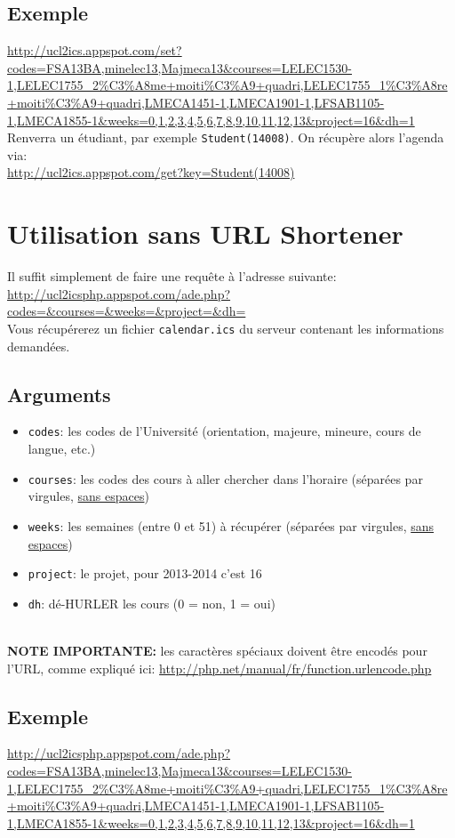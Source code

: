 \documentclass[12pt,a4paper]{article}
\begin{document}
\subsection{Exemple}
\noindent\url{http://ucl2ics.appspot.com/set?codes=FSA13BA,minelec13,Majmeca13&courses=LELEC1530-1,LELEC1755_2%C3%A8me+moiti%C3%A9+quadri,LELEC1755_1%C3%A8re+moiti%C3%A9+quadri,LMECA1451-1,LMECA1901-1,LFSAB1105-1,LMECA1855-1&weeks=0,1,2,3,4,5,6,7,8,9,10,11,12,13&project=16&dh=1}\\

Renverra un étudiant, par exemple \verb#Student(14008)#. On récupère alors l'agenda via:\\

\noindent\url{http://ucl2ics.appspot.com/get?key=Student(14008)}

\section{Utilisation sans URL Shortener}

Il suffit simplement de faire une requête à l'adresse suivante:\\
\url{http://ucl2icsphp.appspot.com/ade.php?codes=&courses=&weeks=&project=&dh=}\\

Vous récupérerez un fichier \verb#calendar.ics# du serveur contenant les informations demandées.

\subsection{Arguments}
\begin{itemize}
\item \verb#codes#: les codes de l'Université (orientation, majeure, mineure, cours de langue, etc.)
\item \verb#courses#: les codes des cours à aller chercher dans l'horaire (séparées par virgules, \uline{sans espaces})
\item \verb#weeks#: les semaines (entre 0 et 51) à récupérer (séparées par virgules, \uline{sans espaces})
\item \verb#project#: le projet, pour 2013-2014 c'est 16
\item \verb#dh#: dé-HURLER les cours (0 = non, 1 = oui)
\end{itemize}

~\\
\textbf{NOTE IMPORTANTE:} les caractères spéciaux doivent être encodés pour l'URL, comme expliqué ici: \url{http://php.net/manual/fr/function.urlencode.php}

\subsection{Exemple}
\noindent\url{http://ucl2icsphp.appspot.com/ade.php?codes=FSA13BA,minelec13,Majmeca13&courses=LELEC1530-1,LELEC1755_2%C3%A8me+moiti%C3%A9+quadri,LELEC1755_1%C3%A8re+moiti%C3%A9+quadri,LMECA1451-1,LMECA1901-1,LFSAB1105-1,LMECA1855-1&weeks=0,1,2,3,4,5,6,7,8,9,10,11,12,13&project=16&dh=1}
\end{document}
